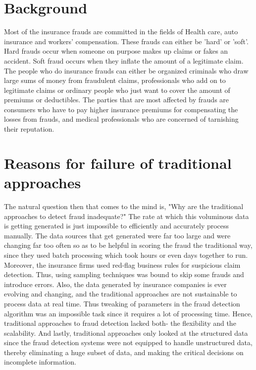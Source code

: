 \documentclass[sigconf]{acmart}
\begin{document}
\section{Background}
Most of the insurance frauds are committed in the fields of Health care, auto insurance and workers' compensation. These frauds can either be 'hard' or 'soft'. Hard frauds occur when someone on purpose makes up claims or fakes an accident. Soft fraud occurs when they inflate the amount of a legitimate claim. The people who do insurance frauds can either be organized criminals who draw large sums of money from fraudulent claims, professionals who add on to legitimate claims or ordinary people who just want to cover the amount of premiums or deductibles. The parties that are most affected by frauds are consumers who have to pay higher insurance premiums for compensating the losses from frauds, and medical professionals who are concerned of tarnishing their reputation\cite{link6}.


\section{Reasons for failure of traditional approaches}
The natural question then that comes to the mind is, "Why are the traditional approaches to detect fraud inadequate?" The rate at which this voluminous data is getting generated is just impossible to efficiently and accurately process manually. The data sources that get generated were far too large and were changing far too often so as to be helpful in scoring the fraud the traditional way, since they used batch processing which took hours or even days together to run. Moreover, the insurance firms used red-flag business rules for suspicious claim detection. Thus, using sampling techniques was bound to skip some frauds and introduce errors. Also, the data generated by insurance companies is ever evolving and changing, and the traditional approaches are not sustainable to process data at real time. Thus tweaking of parameters in the fraud detection algorithm was an impossible task since it requires a lot of processing time. Hence, traditional approaches to fraud detection lacked both- the flexibility and the scalability\cite{link3}. And lastly, traditional approaches only looked at the structured data since the fraud detection systems were not equipped to handle unstructured data, thereby eliminating a huge subset of data, and making the critical decisions on incomplete information\cite{link5}.
\end{document}

